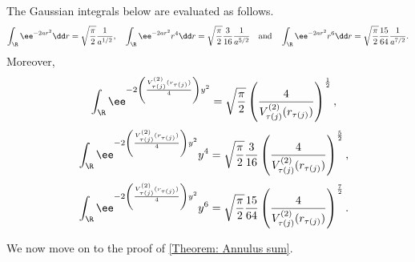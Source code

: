 \begin{proposicao}	\label{Prop: Gaussian integrals}
	The Gaussian integrals below are evaluated as follows.
	\begin{equation}
		\int_{\R} \ee^{-2ar^2} \dd r = \sqrt{\frac{\pi}{2}} \frac{1}{a^{1/2}}, \quad 	\int_{\R} \ee^{-2ar^2} r^4 \dd r = \sqrt{\frac{\pi}{2}} \frac{3}{16} \frac{1}{a^{5/2}} \quad \text{and} \quad \int_{\R} \ee^{-2ar^2} r^6 \dd r = \sqrt{\frac{\pi}{2}} \frac{15}{64} \frac{1}{a^{7/2}}.
	\end{equation}
	Moreover,
	\begin{equation}
		\quad \int_{\R} \ee^{- 2 \left( \frac{V^{(2)}_{\tau(j)}(r_{\tau(j)})}{4} \right) y^2} = \sqrt{\frac{\pi}{2}} \left( \frac{4}{V^{(2)}_{\tau(j)}(r_{\tau(j)})} \right)^{\frac{1}{2}},
	\end{equation}
	\begin{equation}
		\quad \int_{\R} \ee^{- 2 \left( \frac{V^{(2)}_{\tau(j)}(r_{\tau(j)})}{4} \right) y^2} y^4 = \sqrt{\frac{\pi}{2}} \frac{3}{16} \left(\frac{4}{V^{(2)}_{\tau(j)}(r_{\tau(j)})} \right)^{\frac{5}{2}},
	\end{equation}
	\begin{equation}
		\quad \int_{\R}\ee^{- 2 \left( \frac{V^{(2)}_{\tau(j)}(r_{\tau(j)})}{4} \right) y^2} y^6 = \sqrt{\frac{\pi}{2}} \frac{15}{64} \left( \frac{4}{V^{(2)}_{\tau(j)}(r_{\tau(j)})} \right)^{\frac{7}{2}}.
	\end{equation}
\end{proposicao}

We now move on to the proof of \autoref{Theorem: Annulus sum}.

